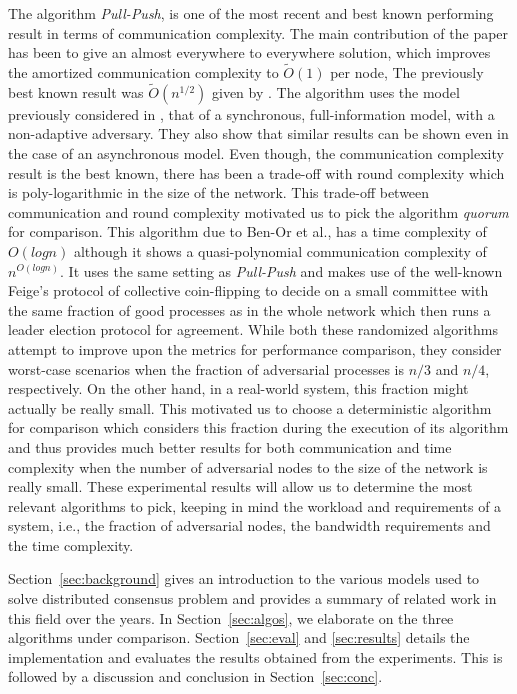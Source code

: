 The algorithm \textit{Pull-Push}, is one of the most recent and best known performing result in terms of communication complexity. The main contribution of the paper has been to give an almost everywhere to everywhere solution, which improves the amortized communication complexity to $\tilde{O}(1)$ per node, The previously best known result was $\tilde{O}(n^{1/2})$ given by \cite{KLST11}. The algorithm uses the model previously considered in \cite{KLST11,KSSV06,BPV06,KS09}, that of a synchronous, full-information model, with a non-adaptive adversary. They also show that similar results can be shown even in the case of an asynchronous model. Even though, the communication complexity result is the best known, there has been a trade-off with round complexity which is poly-logarithmic in the size of the network. This trade-off between communication and round complexity motivated us to pick the algorithm \textit{quorum} for comparison. This algorithm due to Ben-Or et al., has a time complexity of $O(logn)$ although it shows a quasi-polynomial communication complexity of $n^{O(logn)}$. It uses the same setting as \textit{Pull-Push} and makes use of the well-known Feige's protocol of collective coin-flipping to decide on a small committee with the same fraction of good processes as in the whole network which then runs a leader election protocol for agreement. While both these randomized algorithms attempt to improve upon the metrics for performance comparison, they consider worst-case scenarios when the fraction of adversarial processes is $n/3$ and $n/4$, respectively. On the other hand, in a real-world system, this fraction might actually be really small. This motivated us to choose a deterministic algorithm for comparison which considers this fraction during the execution of its algorithm and thus provides much better results for both communication and time complexity when the number of adversarial nodes to the size of the network is really small. These experimental results will allow us to determine the most relevant algorithms to pick, keeping in mind the workload and requirements of a system, i.e., the fraction of adversarial nodes, the bandwidth requirements and the time complexity. 


Section~\ref{sec:background} gives an introduction to the various models used to solve distributed consensus problem and provides a summary of related work in this field over the years. In Section~\ref{sec:algos}, we elaborate on the three algorithms under comparison. Section~\ref{sec:eval} and \ref{sec:results} details the implementation and evaluates the results obtained from the experiments. This is followed by a discussion and conclusion in Section~\ref{sec:conc}.

